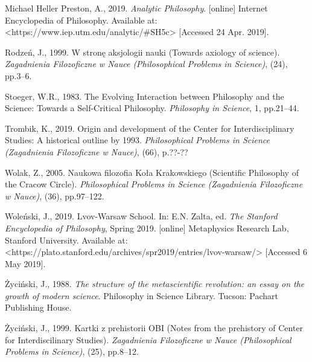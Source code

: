 \begin{artengenv}{Michael Heller}
Preston, A., 2019. \textit{Analytic Philosophy}. [online] Internet Encyclopedia of Philosophy. Available at:
{\textless}https://www.iep.utm.edu/analytic/\#SH5c{\textgreater} [Accessed 24 Apr. 2019].

Rodzeń, J., 1999. W stronę aksjologii nauki (Towards axiology of science). \textit{Zagadnienia Filozoficzne w Nauce
(Philosophical Problems in Science)}, (24), pp.3–6.

Stoeger, W.R., 1983. The Evolving Interaction between Philosophy and the Science: Towards a Self-Critical Philosophy.
\textit{Philosophy in Science}, 1, pp.21–44.

Trombik, K., 2019. Origin and development of the Center for Interdisciplinary Studies: A historical outline by 1993.
\textit{Philosophical Problems in Science (Zagadnienia Filozoficzne w Nauce)}, (66), p.??-??

Wolak, Z., 2005. Naukowa filozofia Koła Krakowskiego (Scientific Philosophy of the Cracow Circle). \textit{Philosophical
Problems in Science (Zagadnienia Filozoficzne w Nauce)}, (36), pp.97–122.

Woleński, J., 2019. Lvov-Warsaw School. In: E.N. Zalta, ed. \textit{The Stanford Encyclopedia of Philosophy}, Spring
2019. [online] Metaphysics Research Lab, Stanford University. Available at:
{\textless}https://plato.stanford.edu/archives/spr2019/entries/lvov-warsaw/{\textgreater} [Accessed 6 May 2019].

Życiński, J., 1988. \textit{The structure of the metascientific revolution: an essay on the growth of modern science}.
Philosophy in Science Library. Tucson: Pachart Publishing House.

Życiński, J., 1999. Kartki z prehistorii OBI (Notes from the prehistory of Center for Interdiscilinary Studies).
\textit{Zagadnienia Filozoficzne w Nauce (Philosophical Problems in Science)}, (25), pp.8–12.



\end{artengenv}
